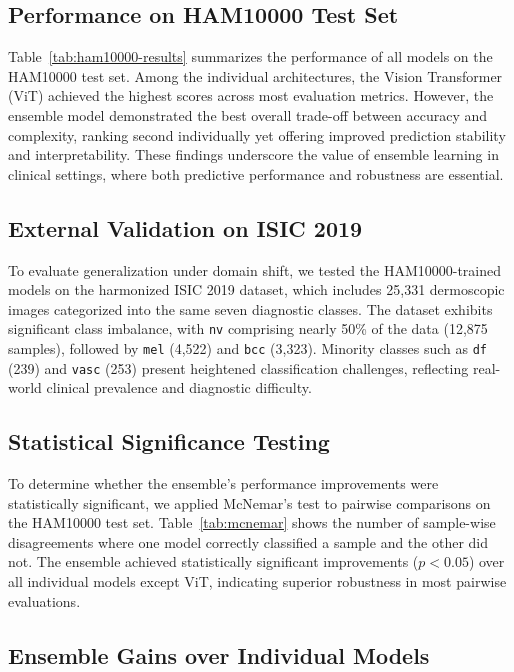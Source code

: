 \documentclass[pdflatex,sn-mathphys-num]{sn-jnl}%
\theoremstyle{thmstyleone}%
\theoremstyle{thmstyletwo}%
\theoremstyle{thmstylethree}%
\begin{document}
\subsection{Performance on HAM10000 Test Set}

Table~\ref{tab:ham10000-results} summarizes the performance of all models on the HAM10000 test set. Among the individual architectures, the Vision Transformer (ViT) achieved the highest scores across most evaluation metrics. However, the ensemble model demonstrated the best overall trade-off between accuracy and complexity, ranking second individually yet offering improved prediction stability and interpretability. These findings underscore the value of ensemble learning in clinical settings, where both predictive performance and robustness are essential.

\subsection{External Validation on ISIC 2019}

To evaluate generalization under domain shift, we tested the HAM10000-trained models on the harmonized ISIC 2019 dataset, which includes 25,331 dermoscopic images categorized into the same seven diagnostic classes. The dataset exhibits significant class imbalance, with \texttt{nv} comprising nearly 50\% of the data (12,875 samples), followed by \texttt{mel} (4,522) and \texttt{bcc} (3,323). Minority classes such as \texttt{df} (239) and \texttt{vasc} (253) present heightened classification challenges, reflecting real-world clinical prevalence and diagnostic difficulty.

\subsection{Statistical Significance Testing}

To determine whether the ensemble's performance improvements were statistically significant, we applied McNemar’s test to pairwise comparisons on the HAM10000 test set. Table~\ref{tab:mcnemar} shows the number of sample-wise disagreements where one model correctly classified a sample and the other did not. The ensemble achieved statistically significant improvements ($p < 0.05$) over all individual models except ViT, indicating superior robustness in most pairwise evaluations.

\subsection{Ensemble Gains over Individual Models}
\end{document}
